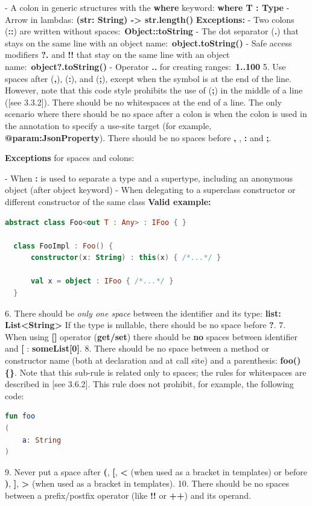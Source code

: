  - A colon in generic structures with the \textbf{where} keyword:  \textbf{where T : Type}
 - Arrow in lambdas: \textbf{(str: String) -> str.length()}
\textbf{Exceptions:}
- Two colons (\textbf{::}) are written without spaces:\
  \textbf{Object::toString}
- The dot separator (\textbf{.}) that stays on the same line with an object name:\
  \textbf{object.toString()}
- Safe access modifiers \textbf{?.} and \textbf{!!} that stay on the same line with an object name:\
  \textbf{object?.toString()}
- Operator \textbf{..} for creating ranges:\
  \textbf{1..100}
5.  Use spaces after (\textbf{,}), (\textbf{:}), and (\textbf{;}), except when the symbol is at the end of the line.
    However, note that this code style prohibits the use of (\textbf{;}) in the middle of a line ([see 3.3.2]).
    There should be no whitespaces at the end of a line.
    The only scenario where there should be no space after a colon is when the colon is used in the annotation to specify a use-site target (for example, \textbf{@param:JsonProperty}).
    There should be no spaces before \textbf{,} , \textbf{:} and \textbf{;}.

    \textbf{Exceptions} for spaces and colons:

    - When \textbf{:} is used to separate a type and a supertype, including an anonymous object (after object keyword)
    - When delegating to a superclass constructor or different constructor of the same class
\textbf{Valid example:}
\begin{lstlisting}[language=Kotlin]
  abstract class Foo<out T : Any> : IFoo { }

  class FooImpl : Foo() {
      constructor(x: String) : this(x) { /*...*/ }

      val x = object : IFoo { /*...*/ }
  }
\end{lstlisting}
6. There should be \textit{only one space} between the identifier and its type: \textbf{list: List<String>}
If the type is nullable, there should be no space before \textbf{?}.
7. When using \textbf{[]} operator (\textbf{get/set}) there should be \textbf{no} spaces between identifier and \textbf{[} : \textbf{someList[0]}.
8. There should be no space between a method or constructor name (both at declaration and at call site) and a parenthesis:
   \textbf{foo() \{\}}. Note that this sub-rule is related only to spaces; the rules for whitespaces are described in [see 3.6.2].
    This rule does not prohibit, for example, the following code:
\begin{lstlisting}[language=Kotlin]
fun foo
(
    a: String
)
\end{lstlisting}
9. Never put a space after \textbf{(}, \textbf{[}, \textbf{<} (when used as a bracket in templates) or before \textbf{)}, \textbf{]}, \textbf{>} (when used as a bracket in templates).
10. There should be no spaces between a prefix/postfix operator (like \textbf{!!} or \textbf{++}) and its operand.
